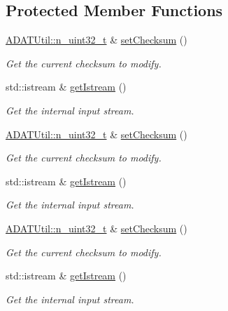 \subsection*{Protected Member Functions}
\begin{DoxyCompactItemize}
\item 
\mbox{\hyperlink{namespaceADATUtil_ad945a8afa4db2d1f89b731964adae97e}{A\+D\+A\+T\+Util\+::n\+\_\+uint32\+\_\+t}} \& \mbox{\hyperlink{classADATIO_1_1BinaryFileReader_a9279d31577b7fffa174df067c72ebcc4}{set\+Checksum}} ()
\begin{DoxyCompactList}\small\item\em Get the current checksum to modify. \end{DoxyCompactList}\item 
std\+::istream \& \mbox{\hyperlink{classADATIO_1_1BinaryFileReader_ae0985a1157f9baa87580606cfcf98908}{get\+Istream}} ()
\begin{DoxyCompactList}\small\item\em Get the internal input stream. \end{DoxyCompactList}\item 
\mbox{\hyperlink{namespaceADATUtil_ad945a8afa4db2d1f89b731964adae97e}{A\+D\+A\+T\+Util\+::n\+\_\+uint32\+\_\+t}} \& \mbox{\hyperlink{classADATIO_1_1BinaryFileReader_a9279d31577b7fffa174df067c72ebcc4}{set\+Checksum}} ()
\begin{DoxyCompactList}\small\item\em Get the current checksum to modify. \end{DoxyCompactList}\item 
std\+::istream \& \mbox{\hyperlink{classADATIO_1_1BinaryFileReader_ae0985a1157f9baa87580606cfcf98908}{get\+Istream}} ()
\begin{DoxyCompactList}\small\item\em Get the internal input stream. \end{DoxyCompactList}\item 
\mbox{\hyperlink{namespaceADATUtil_ad945a8afa4db2d1f89b731964adae97e}{A\+D\+A\+T\+Util\+::n\+\_\+uint32\+\_\+t}} \& \mbox{\hyperlink{classADATIO_1_1BinaryFileReader_a9279d31577b7fffa174df067c72ebcc4}{set\+Checksum}} ()
\begin{DoxyCompactList}\small\item\em Get the current checksum to modify. \end{DoxyCompactList}\item 
std\+::istream \& \mbox{\hyperlink{classADATIO_1_1BinaryFileReader_ae0985a1157f9baa87580606cfcf98908}{get\+Istream}} ()
\begin{DoxyCompactList}\small\item\em Get the internal input stream. \end{DoxyCompactList}\end{DoxyCompactItemize}


